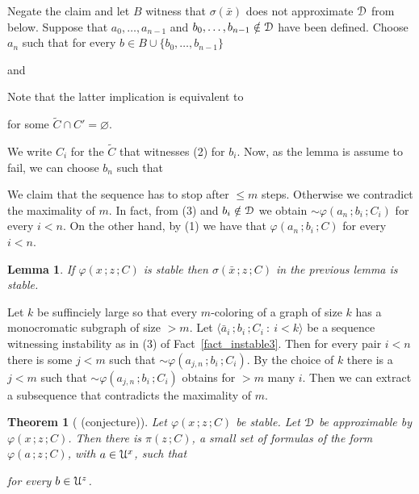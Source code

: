 \documentclass{amsproc}
\makeatletter
\newcounter{thm}
\theoremstyle{mio}
\newtheorem{theorem}[thm]{Theorem}\tcolorboxenvironment{theorem}{mythm}
\newtheorem{lemma}[thm]{Lemma}\tcolorboxenvironment{lemma}{mythm}
\providecommand{\proofNameStyle}{\bfseries}
\renewenvironment{proof}[1][\proofname]{\par
  \pushQED{\qed}%
  \normalfont%
  \trivlist
  \item[\hskip\labelsep
        \proofNameStyle
    #1\@addpunct{.}]\ignorespaces
}{%
  \popQED\endtrivlist\@endpefalse
}
\makeatother
\begin{document}
\begin{proof}
  Negate the claim and let $B$ witness that $\sigma(\bar x)$ does not approximate ${\EuScript D}$ from below.
  Suppose that $a_0,\dots,a_{n-1}$ and $b_0,\dots,b_{n-1}\notin{\EuScript D}$ have been defined.
  Choose $a_n$ such that for every $b\in B\cup\{b_0,\dots,b_{n-1}\}$

  \quad and

  
  Note that the latter implication is equivalent to 
  
  \hfill for some $\tilde C\cap C'=\varnothing$.

  We write $C_i$ for the $\tilde C$ that witnesses (2) for $b_i$.
  Now, as the lemma is assume to fail, we can choose $b_n$ such that


  We claim that the sequence has to stop after $\le m$ steps. 
  Otherwise we contradict the maximality of $m$.
  In fact, from (3) and $b_i\notin{\EuScript D}$ we obtain ${\sim}\varphi(a_n\,;b_i\,;C_i)$ for every $i<n$.
  On the other hand, by (1) we have that $\varphi(a_n\,;b_i\,;C)$ for every $i<n$.
\end{proof}

\begin{lemma}
  If $\varphi(x\,;z\,;C)$ is stable then $\sigma(\bar x\,;z\,;C)$ in the previous lemma is stable.
\end{lemma}

\begin{proof}
  Let $k$ be suffinciely large so that every $m$-coloring of a graph of size $k$ has a monocromatic subgraph of size $>m$.
  Let $\langle \bar a_i\,;b_i\,;C_i\ :\ i<k\rangle$ be a sequence witnessing instability as in (3) of Fact~\ref{fact_instable3}.
  Then for every pair $i<n$ there is some $j<m$ such that ${\sim}\varphi(a_{j,n}\,;b_i\,;C_i)$.
  By the choice of $k$ there is a $j<m$ such that ${\sim}\varphi(a_{j,n}\,;b_i\,;C_i)$ obtains for $>m$ many $i$.
  Then we can extract a subsequence that contradicts the maximality of $m$.
\end{proof}

\begin{theorem}[ (conjecture)]\label{thm_stable_definable}
  Let $\varphi(x\,;z\,;C)$ be stable.
  Let ${\EuScript D}$ be approximable by $\varphi(x\,;z\,;C)$.
  Then there is $\pi(z\,;C)$, a small set of formulas of the form $\varphi(a\,;z\,;C)$, with $a\in{\EuScript U}^x$, such that

  \hfill for every $b\in{\EuScript U}^z$.
\end{theorem}
\end{document}
